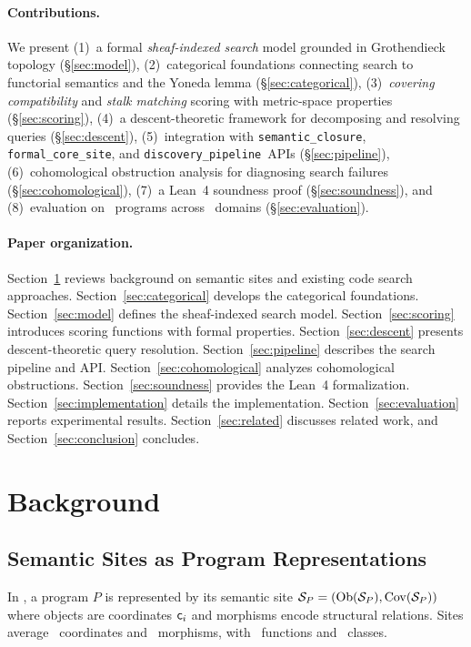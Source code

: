\documentclass[11pt]{article}
\newcommand{\SemanticClosure}{\texttt{semantic\_closure}}
\newcommand{\FormalCoreSite}{\texttt{formal\_core\_site}}
\newcommand{\DiscoveryPipeline}{\texttt{discovery\_pipeline}}
\begin{document}
\paragraph{Contributions.}
We present (1)~a formal \emph{sheaf-indexed search} model grounded in
Grothendieck topology (§\ref{sec:model}), (2)~categorical foundations
connecting search to functorial semantics and the Yoneda lemma
(§\ref{sec:categorical}), (3)~\emph{covering compatibility} and
\emph{stalk matching} scoring with metric-space properties
(§\ref{sec:scoring}), (4)~a descent-theoretic framework for
decomposing and resolving queries (§\ref{sec:descent}),
(5)~integration with \SemanticClosure, \FormalCoreSite, and
\DiscoveryPipeline\ APIs (§\ref{sec:pipeline}),
(6)~cohomological obstruction analysis for diagnosing search
failures (§\ref{sec:cohomological}), (7)~a Lean~4 soundness proof
(§\ref{sec:soundness}), and (8)~evaluation on \compTotalPrograms\
programs across \expDomainCount\ domains (§\ref{sec:evaluation}).

\paragraph{Paper organization.}
Section~\ref{sec:background} reviews background on semantic sites and
existing code search approaches.
Section~\ref{sec:categorical} develops the categorical foundations.
Section~\ref{sec:model} defines the sheaf-indexed search model.
Section~\ref{sec:scoring} introduces scoring functions with formal
properties.
Section~\ref{sec:descent} presents descent-theoretic query resolution.
Section~\ref{sec:pipeline} describes the search pipeline and API.
Section~\ref{sec:cohomological} analyzes cohomological obstructions.
Section~\ref{sec:soundness} provides the Lean~4 formalization.
Section~\ref{sec:implementation} details the implementation.
Section~\ref{sec:evaluation} reports experimental results.
Section~\ref{sec:related} discusses related work, and
Section~\ref{sec:conclusion} concludes.

\section{Background}\label{sec:background}

\subsection{Semantic Sites as Program Representations}
In \JuGeo, a program $P$ is represented by its semantic site
$\mathcal{S}_P = (\mathrm{Ob}(\mathcal{S}_P), \mathrm{Cov}(\mathcal{S}_P))$ where objects are coordinates
$\mathsf{c}_i$ and morphisms encode structural relations.  Sites average
\compSiteMeanCoords\ coordinates and \compSiteMeanMorphisms\ morphisms,
with \compSiteTotalFunctions\ functions and \compSiteTotalClasses\ classes.
\end{document}
